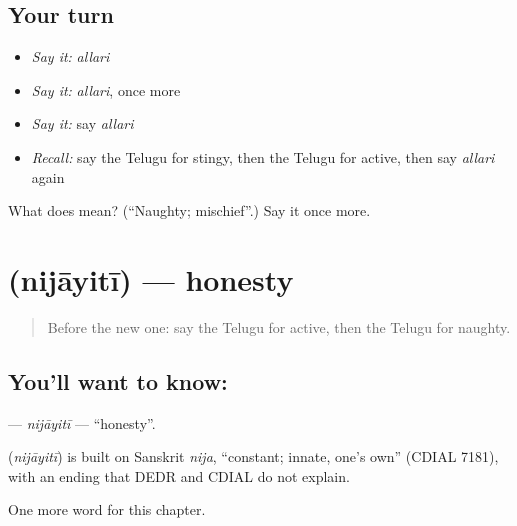 \subsection*{Your turn}
\begin{itemize}
\raggedright
  \item \emph{Say it:} \emph{allari}
  \item \emph{Say it:} \emph{allari}, once more
  \item \emph{Say it:} say \emph{allari}
  \item \emph{Recall:} say the Telugu for stingy, then the Telugu for active, then say \emph{allari} again
\end{itemize}

\begin{tcolorbox}[breakable,colback=teal!4,colframe=teal!35!black,title={Before you move on}]
What does  mean? (\textquotedblleft{}Naughty; mischief\textquotedblright{}.) Say it once more.
\end{tcolorbox}
\section[\texorpdfstring{\te{నిజాయితీ} (nijāyitī)}{నిజాయితీ (nijāyitī)}]{ (nijāyitī) — honesty}

\label{lesson:TE-C297-nijayiti}



\begin{quote}
Before the new one: say the Telugu for active, then the Telugu for naughty.
\end{quote}

\subsection*{You'll want to know: }
\textbf{} — \emph{nijāyitī} — \textquotedblleft{}honesty\textquotedblright{}.

\begin{cousinweb}
\textbf{} (\emph{nijāyitī}) is built on Sanskrit \emph{nija}, \textquotedblleft{}constant; innate, one's own\textquotedblright{} (CDIAL 7181), with an ending that DEDR and CDIAL do not explain.
\end{cousinweb}

\begin{grammarlens}[title={What you've built}]
One more word for this chapter.
\end{grammarlens}

